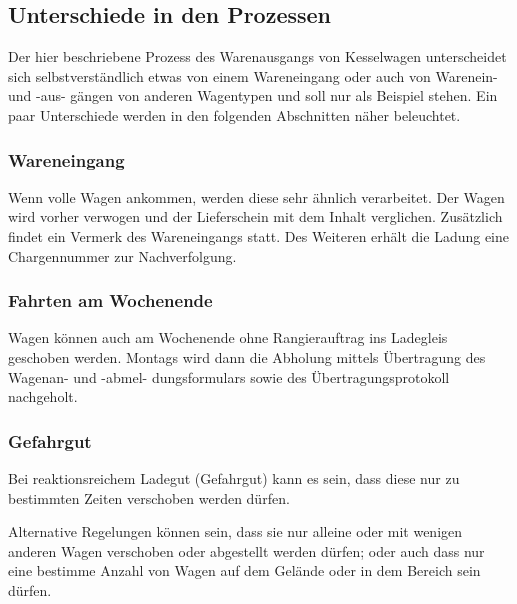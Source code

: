 \subsection{Unterschiede in den Prozessen}
Der hier beschriebene Prozess des Warenausgangs von Kesselwagen unterscheidet sich selbstverständlich etwas von einem Wareneingang oder auch von Warenein- und -aus- gängen von anderen Wagentypen und soll nur als Beispiel stehen. Ein paar Unterschiede werden in den folgenden Abschnitten näher beleuchtet.
\subsubsection{Wareneingang}
Wenn volle Wagen ankommen, werden diese sehr ähnlich verarbeitet. Der Wagen wird vorher verwogen und der Lieferschein mit dem Inhalt verglichen. Zusätzlich findet ein Vermerk des Wareneingangs statt. Des Weiteren erhält die Ladung eine Chargennummer zur Nachverfolgung.
\subsubsection{Fahrten am Wochenende}
Wagen können auch am Wochenende ohne Rangierauftrag ins Ladegleis geschoben werden. Montags wird dann die Abholung mittels Übertragung des Wagenan- und -abmel- dungsformulars sowie des Übertragungsprotokoll nachgeholt.
\subsubsection{Gefahrgut}
Bei reaktionsreichem Ladegut (Gefahrgut) kann es sein, dass diese nur zu bestimmten Zeiten verschoben werden dürfen.\par
Alternative Regelungen können sein,  dass sie nur alleine oder mit wenigen anderen Wagen verschoben oder abgestellt werden dürfen; oder auch dass nur eine bestimme Anzahl von Wagen auf dem Gelände oder in dem Bereich sein dürfen.
